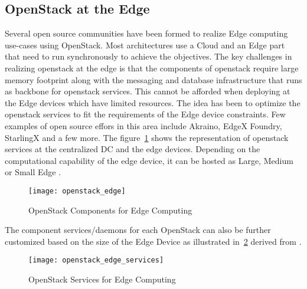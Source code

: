 \newpage
\subsection{OpenStack at the Edge}

Several open source communities have been formed to realize Edge computing use-cases using OpenStack. Most architectures use a Cloud and an Edge part that need to run synchronously to achieve the objectives. The key challenges in realizing openstack at the edge is that the components of openstack require large memory footprint along with the messaging and database infrastructure that runs as backbone for openstack services. This cannot be afforded when deploying at the Edge devices which have limited resources. The idea has been to optimize the openstack services to fit the requirements of the Edge device constraints. Few examples of open source effors in this area include Akraino, EdgeX Foundry, StarlingX and a few more. The figure~\ref{fig:figure13} shows the representation of openstack services at the centralized DC and the edge devices. Depending on the computational capability of the edge device, it can be hosted as Large, Medium or Small Edge \cite{osedge}.

\begin{figure}[h!]
    \centering
    \texttt{[image: openstack\_edge]}
    \label{fig:figure13}
    \caption{OpenStack Components for Edge Computing}
\end{figure}

The component services/daemons for each OpenStack can also be further customized based on the size of the Edge Device as illustrated in~\ref{fig:figure14} derived from \cite{osedge}.

\begin{figure}[h!]
    \centering
    \texttt{[image: openstack\_edge\_services]}
    \label{fig:figure14}
    \caption{OpenStack Services for Edge Computing}
\end{figure}


